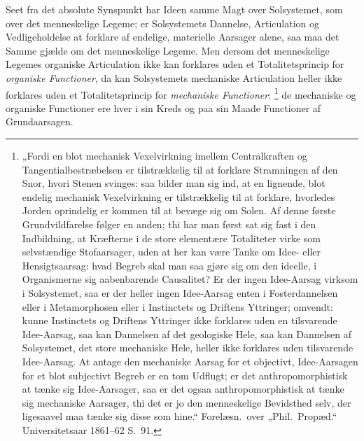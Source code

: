 \documentclass[12pt]{book}
\newcommand{\opage}[1]{\marginnote{\footnotesize\textit{[#1]}}}
\begin{document}
Seet fra det absolute Synspunkt har Ideen samme Magt over Solsystemet, som over det menneskelige
Legeme; er Solsystemets Dannelse, Articulation og Vedligeholdelse at forklare af endelige,
materielle Aarsager alene, saa maa det Samme gjælde om det menneskelige Legeme. Men dersom det
menneskelige Legemes organiske Articulation ikke kan forklares uden et Totalitetsprincip for
\emph{organiske Functioner}, da kan Solsystemets mechaniske Articulation heller ikke forklares
uden et Totalitetsprincip for \emph{mechaniske Functioner}:%
\footnote{„Fordi en blot mechanisk Vexelvirkning imellem Centralkraften og Tangentialbestræbelsen
  er tilstrækkelig til at forklare Stramningen af den Snor, hvori Stenen svinges: saa bilder man
  sig ind, at en lignende, blot endelig mechanisk Vexelvirkning er tilstrækkelig til at forklare,
  hvorledes Jorden oprindelig er kommen til at bevæge sig om Solen. Af denne første
  Grundvildfarelse følger en anden; thi har man først sat sig fast i den Indbildning, at
  Kræfterne i de store elementære Totaliteter virke som selvstændige Stofaarsager, uden at her
  kan være Tanke om Idee- eller Hensigtsaarsag: hvad Begreb skal man saa gjøre sig om den
  ideelle, i Organismerne sig aabenbarende Causalitet? Er der ingen Idee-Aarsag virksom i
  Solsystemet, saa er der heller ingen Idee-Aarsag enten i Fosterdannelsen eller i Metamorphosen
  eller i Instinctets og Driftens Yttringer; omvendt: kunne Instinctets og Driftens Yttringer
  ikke forklares uden en tilsvarende Idee-Aarsag, saa kan Dannelsen af det geologiske Hele, saa
  kan Dannelsen af Solsystemet, det store mechaniske Hele, heller ikke forklares uden tilsvarende
  Idee-Aarsag. At antage den mechaniske Aarsag for et objectivt, Idee-Aarsagen for et blot
  subjectivt Begreb er en tom Udflugt; er det anthropomorphistisk at tænke sig Idee-Aarsager, saa
  er det ogsaa anthropomorphistisk at tænke sig mechaniske Aarsager, thi det er jo den
  menneskelige Bevidsthed selv, der ligesaavel maa tænke sig disse som hine.“ Forelæsn.\ over
  „Phil.\ Propæd.“ Universitetsaar 1861--62 S.~91.}
\opage{400} de mechaniske og organiske Functioner ere hver i sin Kreds og paa sin Maade Functioner af
Grundaarsagen.
\end{document}
